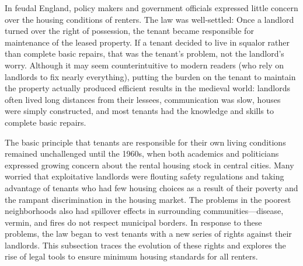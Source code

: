 In feudal England, policy makers and government officials expressed little
concern over the housing conditions of renters.  The law was well-settled: Once
a landlord turned over the right of possession, the tenant became responsible
for maintenance of the leased property.  If a tenant decided to live in squalor
rather than complete basic repairs, that was the tenant's problem, not the
landlord's worry. Although it may seem counterintuitive to modern readers (who
rely on landlords to fix nearly everything), putting the burden on the tenant
to maintain the property actually produced efficient results in the medieval
world: landlords often lived long distances from their lessees, communication
was slow, houses were simply constructed, and most tenants had the knowledge
and skills to complete basic repairs.  

The basic principle that tenants are responsible for their own living conditions
remained unchallenged until the 1960s, when both academics and politicians
expressed growing concern about the rental housing stock in central cities. 
Many worried that exploitative landlords were flouting safety regulations and
taking advantage of tenants who had few housing choices as a result of their
poverty and the rampant discrimination in the housing market.  The problems in
the poorest neighborhoods also had spillover effects in surrounding
communities---disease, vermin, and fires do not respect municipal borders.  In
response to these problems, the law began to vest tenants with a new series of
rights against their landlords.  This subsection traces the evolution of these
rights and explores the rise of legal tools to ensure minimum housing standards
for all renters. 

